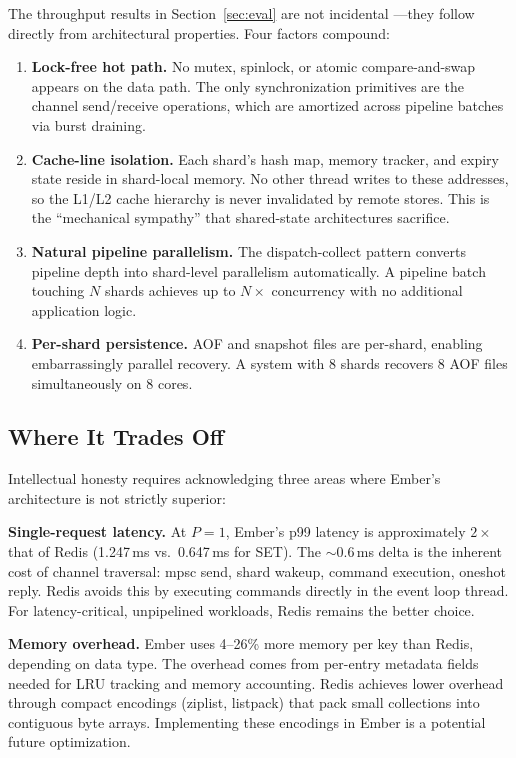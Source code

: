\documentclass[conference]{IEEEtran}
\begin{document}
The throughput results in Section~\ref{sec:eval} are not incidental
---they follow directly from architectural properties. Four factors
compound:

\begin{enumerate}
  \item \textbf{Lock-free hot path.} No mutex, spinlock, or atomic
    compare-and-swap appears on the data path. The only
    synchronization primitives are the channel send/receive operations,
    which are amortized across pipeline batches via burst draining.

  \item \textbf{Cache-line isolation.} Each shard's hash map, memory
    tracker, and expiry state reside in shard-local memory. No other
    thread writes to these addresses, so the L1/L2 cache hierarchy
    is never invalidated by remote stores. This is the ``mechanical
    sympathy'' that shared-state architectures sacrifice.

  \item \textbf{Natural pipeline parallelism.} The dispatch-collect
    pattern converts pipeline depth into shard-level parallelism
    automatically. A pipeline batch touching $N$ shards achieves up
    to $N\times$ concurrency with no additional application logic.

  \item \textbf{Per-shard persistence.} AOF and snapshot files are
    per-shard, enabling embarrassingly parallel recovery. A system
    with 8 shards recovers 8 AOF files simultaneously on 8 cores.
\end{enumerate}

\subsection{Where It Trades Off}

Intellectual honesty requires acknowledging three areas where Ember's
architecture is not strictly superior:

\textbf{Single-request latency.} At $P{=}1$, Ember's p99 latency is
approximately $2\times$ that of Redis (1.247\,ms vs.\ 0.647\,ms for
SET). The ${\sim}0.6$\,ms delta is the inherent cost of channel
traversal: mpsc send, shard wakeup, command execution, oneshot reply.
Redis avoids this by executing commands directly in the event loop
thread. For latency-critical, unpipelined workloads, Redis remains
the better choice.

\textbf{Memory overhead.} Ember uses 4--26\% more memory per key
than Redis, depending on data type. The overhead comes from per-entry
metadata fields needed for LRU tracking and memory accounting. Redis
achieves lower overhead through compact encodings (ziplist, listpack)
that pack small collections into contiguous byte arrays. Implementing
these encodings in Ember is a potential future optimization.
\end{document}
